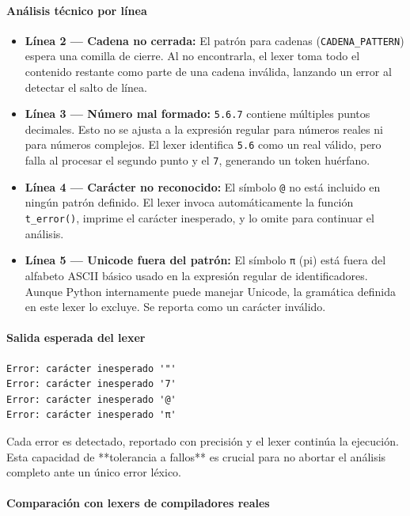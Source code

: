 \documentclass{article}
\begin{document}
\paragraph{Análisis técnico por línea}

\begin{itemize}
  \item \textbf{Línea 2 — Cadena no cerrada:} El patrón para cadenas (\texttt{CADENA\_PATTERN}) espera una comilla de cierre. Al no encontrarla, el lexer toma todo el contenido restante como parte de una cadena inválida, lanzando un error al detectar el salto de línea.
  
  \item \textbf{Línea 3 — Número mal formado:} \texttt{5.6.7} contiene múltiples puntos decimales. Esto no se ajusta a la expresión regular para números reales ni para números complejos. El lexer identifica \texttt{5.6} como un real válido, pero falla al procesar el segundo punto y el \texttt{7}, generando un token huérfano.

  \item \textbf{Línea 4 — Carácter no reconocido:} El símbolo \texttt{@} no está incluido en ningún patrón definido. El lexer invoca automáticamente la función \texttt{t\_error()}, imprime el carácter inesperado, y lo omite para continuar el análisis.

  \item \textbf{Línea 5 — Unicode fuera del patrón:} El símbolo \texttt{π} (pi) está fuera del alfabeto ASCII básico usado en la expresión regular de identificadores. Aunque Python internamente puede manejar Unicode, la gramática definida en este lexer lo excluye. Se reporta como un carácter inválido.
\end{itemize}

\paragraph{Salida esperada del lexer}

\begin{verbatim}
Error: carácter inesperado '"'
Error: carácter inesperado '7'
Error: carácter inesperado '@'
Error: carácter inesperado 'π'
\end{verbatim}

Cada error es detectado, reportado con precisión y el lexer continúa la ejecución. Esta capacidad de **tolerancia a fallos** es crucial para no abortar el análisis completo ante un único error léxico.

\paragraph{Comparación con lexers de compiladores reales}
\end{document}
